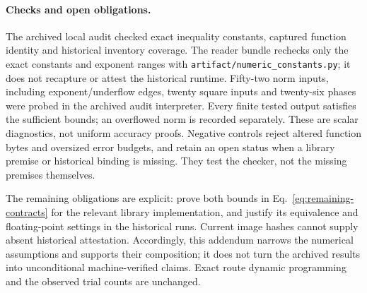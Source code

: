 \paragraph{Checks and open obligations.}
The archived local audit checked exact inequality constants, captured function
identity and historical inventory coverage. The reader bundle rechecks only
the exact constants and exponent ranges with \texttt{artifact/numeric\_constants.py};
it does not recapture or attest the historical runtime. Fifty-two norm inputs,
including exponent/underflow edges, twenty square inputs and twenty-six
phases were probed in the archived audit interpreter. Every finite tested output
satisfies the sufficient bounds; an overflowed norm is recorded separately.
These are scalar diagnostics, not uniform accuracy proofs. Negative
controls reject altered function bytes and oversized error budgets, and
retain an open status when a library premise or historical binding is
missing. They test the checker, not the missing premises themselves.

The remaining obligations are explicit: prove both bounds in
Eq.~\eqref{eq:remaining-contracts} for the relevant library implementation,
and justify its equivalence and floating-point settings in the historical
runs. Current image hashes cannot supply absent historical attestation.
Accordingly, this addendum narrows the numerical assumptions and supports
their composition; it does not turn the archived results into unconditional
machine-verified claims. Exact route dynamic programming and the
observed trial counts are unchanged.

